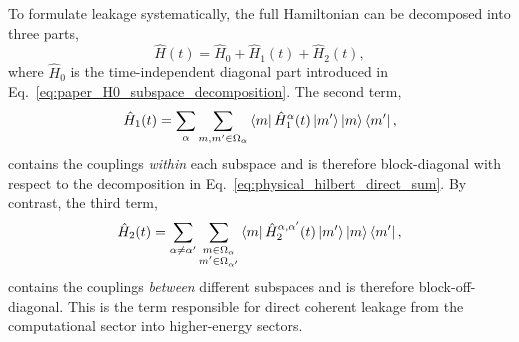 To formulate leakage systematically, the full Hamiltonian can be decomposed into three parts,
\begin{equation}
\hat{H}(t)
=
\hat{H}_0
+
\hat{H}_1(t)
+
\hat{H}_2(t),
\label{eq:paper_H_decomposition}
\end{equation}
where $\hat{H}_0$ is the time-independent diagonal part introduced in Eq.~\eqref{eq:paper_H0_subspace_decomposition}. The second term,
\begin{equation}
\hat{H}_1(t)
=
\sum_{\alpha}
\sum_{m,m'\in\Omega_\alpha}
\bra{m}\hat{H}_1^{\alpha}(t)\ket{m'}
\ket{m}\bra{m'},
\label{eq:paper_block_diagonal_term}
\end{equation}
contains the couplings \emph{within} each subspace and is therefore block-diagonal with respect to the decomposition in Eq.~\eqref{eq:physical_hilbert_direct_sum}. By contrast, the third term,
\begin{equation}
\hat{H}_2(t)
=
\sum_{\alpha\neq \alpha'}
\sum_{\substack{m\in\Omega_\alpha\\ m'\in\Omega_{\alpha'}}}
\bra{m}\hat{H}_2^{\alpha,\alpha'}(t)\ket{m'}
\ket{m}\bra{m'},
\label{eq:paper_block_off_diagonal_term}
\end{equation}
contains the couplings \emph{between} different subspaces and is therefore block-off-diagonal. This is the term responsible for direct coherent leakage from the computational sector into higher-energy sectors.

